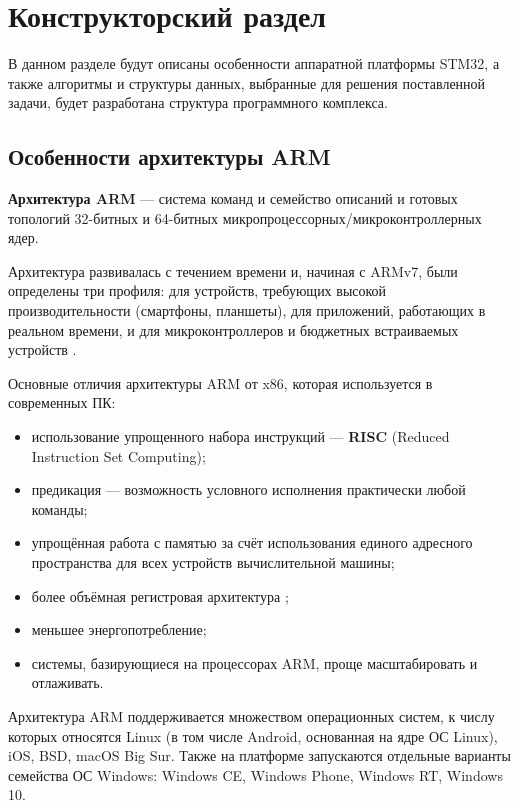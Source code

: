 \chapter{Конструкторский раздел}
\label{cha:design}

В данном разделе будут описаны особенности аппаратной платформы STM32, а также алгоритмы и структуры данных, выбранные для решения 
поставленной задачи, будет разработана структура программного комплекса.

\section{Особенности архитектуры ARM}

\textbf{Архитектура ARM} — система команд и семейство описаний и готовых топологий 32-битных и 64-битных микропроцессорных/микроконтроллерных ядер.

Архитектура развивалась с течением времени и, начиная с ARMv7, были определены три профиля: для устройств, требующих высокой производительности (смартфоны, планшеты), для приложений, работающих в реальном времени, и для микроконтроллеров и бюджетных встраиваемых устройств \cite{ARM_dev_doc}.

Основные отличия архитектуры ARM от x86, которая используется в современных ПК: \cite{ARM_vs_x86} %
\begin{itemize}
	\item использование упрощенного набора инструкций --- \textbf{RISC} (Reduced Instruction Set Computing);
	\item предикация --- возможность условного исполнения практически любой команды;
	\item упрощённая работа с памятью за счёт использования единого адресного пространства для всех устройств вычислительной машины;
	\item более объёмная регистровая архитектура \cite{ARM_registers} \cite{x86_registers};
	\item меньшее энергопотребление;
	\item системы, базирующиеся на процессорах ARM, проще масштабировать и отлаживать.
\end{itemize}

Архитектура ARM поддерживается множеством операционных систем, к числу которых относятся Linux (в том числе Android, основанная на ядре ОС Linux), iOS, BSD, macOS Big Sur. Также на платформе запускаются отдельные варианты семейства ОС Windows: Windows CE, Windows Phone, Windows RT, Windows 10.

